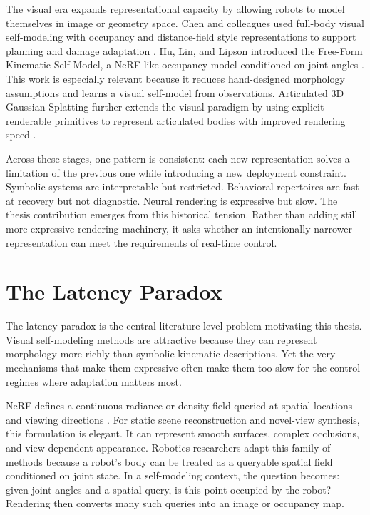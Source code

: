 \documentclass[12pt,a4paper,oneside]{report}
\begin{document}
The visual era expands representational capacity by allowing robots to model themselves in image or geometry space. Chen and colleagues used full-body visual self-modeling with occupancy and distance-field style representations to support planning and damage adaptation \cite{chen2022full}. Hu, Lin, and Lipson introduced the Free-Form Kinematic Self-Model, a NeRF-like occupancy model conditioned on joint angles \cite{hu2024teaching}. This work is especially relevant because it reduces hand-designed morphology assumptions and learns a visual self-model from observations. Articulated 3D Gaussian Splatting further extends the visual paradigm by using explicit renderable primitives to represent articulated bodies with improved rendering speed \cite{hu2025learning}.

Across these stages, one pattern is consistent: each new representation solves a limitation of the previous one while introducing a new deployment constraint. Symbolic systems are interpretable but restricted. Behavioral repertoires are fast at recovery but not diagnostic. Neural rendering is expressive but slow. The thesis contribution emerges from this historical tension. Rather than adding still more expressive rendering machinery, it asks whether an intentionally narrower representation can meet the requirements of real-time control.

\section{The Latency Paradox}

The latency paradox is the central literature-level problem motivating this thesis. Visual self-modeling methods are attractive because they can represent morphology more richly than symbolic kinematic descriptions. Yet the very mechanisms that make them expressive often make them too slow for the control regimes where adaptation matters most.

NeRF defines a continuous radiance or density field queried at spatial locations and viewing directions \cite{mildenhall2020nerf}. For static scene reconstruction and novel-view synthesis, this formulation is elegant. It can represent smooth surfaces, complex occlusions, and view-dependent appearance. Robotics researchers adapt this family of methods because a robot's body can be treated as a queryable spatial field conditioned on joint state. In a self-modeling context, the question becomes: given joint angles and a spatial query, is this point occupied by the robot? Rendering then converts many such queries into an image or occupancy map.
\end{document}
